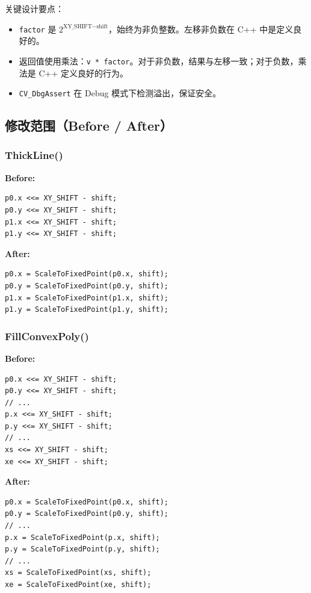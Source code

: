 \documentclass[12pt,a4paper]{article}
\begin{document}
关键设计要点：
\begin{itemize}[leftmargin=*]
    \item \texttt{factor} 是 $2^{\text{XY\_SHIFT} - \text{shift}}$，始终为非负整数。左移非负数在 C++ 中是定义良好的。
    \item 返回值使用乘法：\texttt{v * factor}。对于非负数，结果与左移一致；对于负数，乘法是 C++ 定义良好的行为。
    \item \texttt{CV\_DbgAssert} 在 Debug 模式下检测溢出，保证安全。
\end{itemize}

\subsection{修改范围（Before / After）}

\subsubsection{ThickLine()}

\textbf{Before:}
\begin{lstlisting}
p0.x <<= XY_SHIFT - shift;
p0.y <<= XY_SHIFT - shift;
p1.x <<= XY_SHIFT - shift;
p1.y <<= XY_SHIFT - shift;
\end{lstlisting}

\textbf{After:}
\begin{lstlisting}
p0.x = ScaleToFixedPoint(p0.x, shift);
p0.y = ScaleToFixedPoint(p0.y, shift);
p1.x = ScaleToFixedPoint(p1.x, shift);
p1.y = ScaleToFixedPoint(p1.y, shift);
\end{lstlisting}

\subsubsection{FillConvexPoly()}

\textbf{Before:}
\begin{lstlisting}
p0.x <<= XY_SHIFT - shift;
p0.y <<= XY_SHIFT - shift;
// ...
p.x <<= XY_SHIFT - shift;
p.y <<= XY_SHIFT - shift;
// ...
xs <<= XY_SHIFT - shift;
xe <<= XY_SHIFT - shift;
\end{lstlisting}

\textbf{After:}
\begin{lstlisting}
p0.x = ScaleToFixedPoint(p0.x, shift);
p0.y = ScaleToFixedPoint(p0.y, shift);
// ...
p.x = ScaleToFixedPoint(p.x, shift);
p.y = ScaleToFixedPoint(p.y, shift);
// ...
xs = ScaleToFixedPoint(xs, shift);
xe = ScaleToFixedPoint(xe, shift);
\end{lstlisting}
\end{document}
